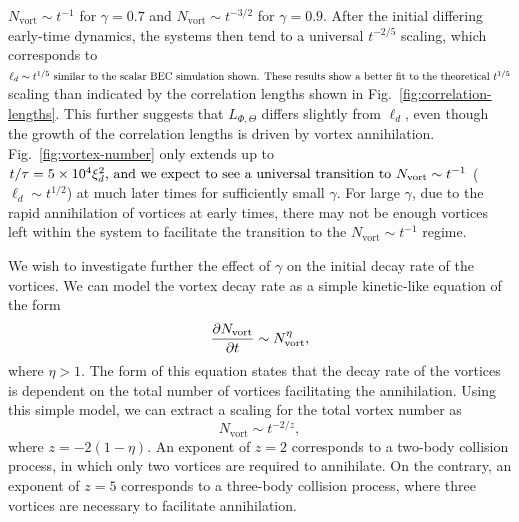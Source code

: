 \(N_\mathrm{vort} \sim t^{-1}\) for \(\gamma=0.7\) and
\(N_\mathrm{vort} \sim t^{-3/2}\) for \(\gamma=0.9\).
After the initial differing early-time dynamics, the systems then tend to a
universal \(t^{-2/5}\) scaling, which corresponds to \(\ell_d\sim t^{1/5}$
similar to the scalar BEC simulation shown.
These results show a better fit to the theoretical \(t^{1/5}\) scaling than 
indicated by the correlation lengths shown in
Fig.~\ref{fig:correlation-lengths}.
This further suggests that \(L_{\Phi,\Theta}\) differs slightly from \(\ell_d\),
even though the growth of the correlation lengths is driven by vortex
annihilation.
Fig.~\ref{fig:vortex-number} only extends up to \(t/\tau=5\times 10^4\xi_d^2$,
and we expect to see a universal transition to
\(N_\mathrm{vort}\sim t^{-1}\) (\(\ell_d\sim t^{1/2}\)) at much later times for
sufficiently small \(\gamma \).
For large \(\gamma \), due to the rapid annihilation of vortices at early times,
there may not be enough vortices left within the system to facilitate the
transition to the \(N_\mathrm{vort} \sim t^{-1}\) regime.
\par
We wish to investigate further the effect of \(\gamma \) on the initial decay
rate of the vortices.
We can model the vortex decay rate as a simple kinetic-like equation of the form
\begin{equation}
    \pdv{N_\mathrm{vort}}{t} \sim N_\mathrm{vort}^\eta,
\end{equation}
where \(\eta > 1\).
The form of this equation states that the decay rate of the vortices is
dependent on the total number of vortices facilitating the annihilation.
Using this simple model, we can extract a scaling for the total vortex
number as
\begin{equation}
    N_\mathrm{vort} \sim t^{-2/z},
    \label{eq:vortex-number-scaling}
\end{equation}
where \(z=-2(1-\eta)\).
An exponent of \(z=2\) corresponds to a two-body collision process, in which
only two vortices are required to annihilate.
On the contrary, an exponent of \(z=5\) corresponds to a three-body collision
process, where three vortices are necessary to facilitate annihilation.
